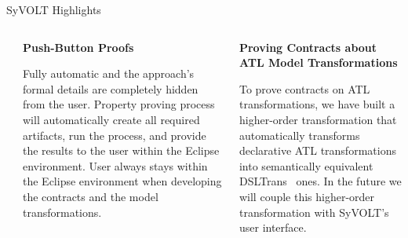\documentclass[final,hyperref={pdfpagelabels=false}]{beamer}
\begin{document}
\begin{frame}{}
\begin{block}{SyVOLT Highlights}
\begin{columns}[t,totalwidth=\linewidth]
\begin{column}{.19\linewidth}
           \end{column}
           \hspace{-1.2cm}\vrule\hspace{.05cm}
           \begin{column}{.175\linewidth}
           \footnotesize
          \begin{center}\textbf{Push-Button Proofs}\end{center}
          \footnotesize
            Fully automatic and the approach's formal details are completely hidden from the user. Property proving process will automatically
            create all required artifacts, run
            the process, and provide the results to the user within the
            Eclipse environment. User always stays within the Eclipse
            environment when developing the contracts and the model
            transformations.
            \end{column}
            \hspace{-1.2cm}\vrule\hspace{.05cm}
            \begin{column}{.16\linewidth}
                        \footnotesize
                      \begin{center}\textbf{Proving Contracts about ATL Model Transformations}\end{center}
                      \footnotesize
                       
                        To prove contracts on ATL transformations,
                        we have built a higher-order transformation that
                        automatically transforms declarative ATL transformations
                        into semantically equivalent DSLTrans~\cite{Oakes} ones. In the
                        future we will couple this higher-order transformation with
                        SyVOLT's user interface.
                        \end{column}
            \hspace{-1.2cm}\vrule\hspace{.05cm}
            
            
            

\end{columns}
\end{block}
\end{frame}
\end{document}
